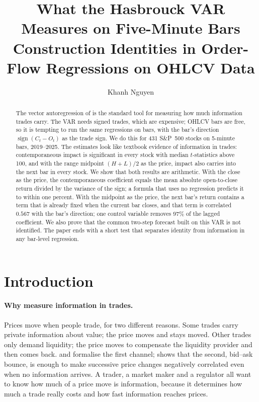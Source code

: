 \documentclass[11pt,a4paper]{article}
\title{\textbf{What the Hasbrouck VAR Measures on Five-Minute Bars}\\[0.4em]
\large Construction Identities in Order-Flow Regressions on OHLCV Data}
\author{Khanh Nguyen}
\date{}
\begin{document}
\maketitle

\begin{abstract}
\noindent The vector autoregression of \citet{hasbrouck1991} is the standard tool for measuring how much
information trades carry. The VAR needs signed trades, which are expensive; OHLCV bars are free, so it is
tempting to run the same regressions on bars, with the bar's direction $\operatorname{sign}(C_t-O_t)$ as
the trade sign. We do this for 431 S\&P~500 stocks on 5-minute bars, 2019--2025. The estimates
look like textbook evidence of information in trades: contemporaneous impact is significant in every
stock with median $t$-statistics above 100, and with the range midpoint $(H+L)/2$ as the price, impact
also carries into the next bar in every stock. We show that both results are arithmetic. With the
close as the price, the contemporaneous coefficient equals the mean absolute open-to-close return
divided by the variance of the sign; a formula that uses no regression predicts it to within one
percent. With the midpoint as the price, the next bar's return contains a term that is already fixed
when the current bar closes, and that term is correlated $0.567$ with the bar's direction; one
control variable removes $97\%$ of the lagged coefficient. We also prove that the common two-step
forecast built on this VAR is not identified. The paper ends with a short test that separates identity
from information in any bar-level regression.
\end{abstract}

\section{Introduction}
\label{sec:intro}

\paragraph{Why measure information in trades.} Prices move when people trade, for two different
reasons. Some trades carry private information about value; the price moves and stays moved. Other
trades only demand liquidity; the price moves to compensate the liquidity provider and then comes back.
\citet{kyle1985} and \citet{glosten1985} formalise the first channel; \citet{roll1984} shows that the
second, bid--ask bounce, is enough to make successive price changes negatively correlated even when no
information arrives. A trader, a market maker and a regulator all want to know how much of a price move
is information, because it determines how much a trade really costs and how fast information reaches
prices.
\end{document}
